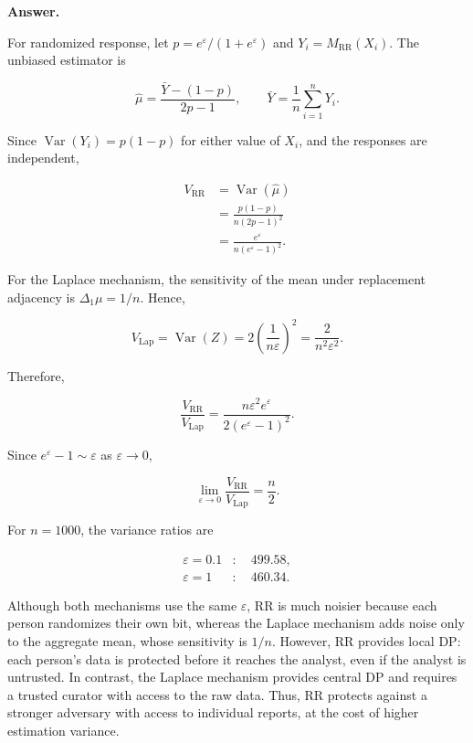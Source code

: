 \documentclass[11pt]{article}
\DeclareMathOperator{\Var}{Var}
\newcommand{\eps}{\varepsilon}
\newenvironment{answer}{\par\medskip\noindent\textbf{Answer.}\ }{\par\bigskip}
\begin{document}
\begin{enumerate}
\begin{answer}

For randomized response, let
$p=e^\eps/(1+e^\eps)$ and
$Y_i=M_{\mathrm{RR}}(X_i)$.
The unbiased estimator is

\[
\hat\mu=\frac{\bar Y-(1-p)}{2p-1},
\qquad
\bar Y=\frac1n\sum_{i=1}^nY_i.
\]

Since $\Var(Y_i)=p(1-p)$ for either
value of $X_i$, and the responses are
independent,

\[
\begin{aligned}
V_{\mathrm{RR}}
&=\Var(\hat\mu)\\
&=\frac{p(1-p)}{n(2p-1)^2}\\
&=\frac{e^\eps}{n(e^\eps-1)^2}.
\end{aligned}
\]

For the Laplace mechanism, the sensitivity
of the mean under replacement adjacency is
$\Delta_1\mu=1/n$. Hence,

\[
V_{\mathrm{Lap}}
=\Var(Z)
=2\left(\frac{1}{n\eps}\right)^2
=\frac{2}{n^2\eps^2}.
\]

Therefore,

\[
\frac{V_{\mathrm{RR}}}{V_{\mathrm{Lap}}}
=\frac{n\eps^2e^\eps}
{2(e^\eps-1)^2}.
\]

Since $e^\eps-1\sim\eps$ as $\eps\to0$,

\[
\lim_{\eps\to0}
\frac{V_{\mathrm{RR}}}{V_{\mathrm{Lap}}}
=\frac n2.
\]

For $n=1000$, the variance ratios are

\[
\begin{aligned}
\eps=0.1 &: \quad 499.58,\\
\eps=1 &: \quad 460.34.
\end{aligned}
\]

Although both mechanisms use the same
$\eps$, RR is much noisier because each
person randomizes their own bit, whereas
the Laplace mechanism adds noise only
to the aggregate mean, whose sensitivity
is $1/n$. However, RR provides local DP:
each person's data is protected before
it reaches the analyst, even if the analyst
is untrusted. In contrast, the Laplace
mechanism provides central DP and requires
a trusted curator with access to the raw
data. Thus, RR protects against a stronger
adversary with access to individual reports,
at the cost of higher estimation variance.

\end{answer}

\end{enumerate}
\end{document}
